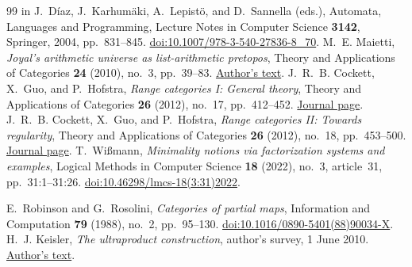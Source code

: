 \begin{thebibliography}{99}
in J.~D\'iaz, J.~Karhum\"aki, A.~Lepist\"o, and D.~Sannella (eds.),
Automata, Languages and Programming, Lecture Notes in Computer Science
\textbf{3142}, Springer, 2004, pp.~831--845.
\href{https://doi.org/10.1007/978-3-540-27836-8_70}{doi:10.1007/978-3-540-27836-8\_70}.
M.~E. Maietti, \emph{Joyal's arithmetic universe as list-arithmetic pretopos},
Theory and Applications of Categories \textbf{24} (2010),
no.~3, pp.~39--83.
\href{https://www.math.unipd.it/~maietti/papers/jartacrev.pdf}{Author's text}.
J.~R.~B. Cockett, X.~Guo, and P.~Hofstra,
\emph{Range categories I: General theory},
Theory and Applications of Categories \textbf{26} (2012),
no.~17, pp.~412--452.
\href{https://www.tac.mta.ca/tac/volumes/26/17/26-17abs.html}{Journal page}.
J.~R.~B. Cockett, X.~Guo, and P.~Hofstra,
\emph{Range categories II: Towards regularity},
Theory and Applications of Categories \textbf{26} (2012),
no.~18, pp.~453--500.
\href{https://www.tac.mta.ca/tac/volumes/26/18/26-18abs.html}{Journal page}.
T.~Wi\ss{}mann, \emph{Minimality notions via factorization systems and examples},
Logical Methods in Computer Science \textbf{18} (2022),
no.~3, article~31, pp.~31:1--31:26.
\href{https://doi.org/10.46298/lmcs-18(3:31)2022}{doi:10.46298/lmcs-18(3:31)2022}.

E.~Robinson and G.~Rosolini, \emph{Categories of partial maps},
Information and Computation \textbf{79} (1988), no.~2, pp.~95--130.
\href{https://doi.org/10.1016/0890-5401(88)90034-X}{doi:10.1016/0890-5401(88)90034-X}.
H.~J. Keisler, \emph{The ultraproduct construction},
author's survey, 1 June 2010.
\href{https://people.math.wisc.edu/~hkeisler/ultraproducts-web-final.pdf}{Author's text}.
\end{thebibliography}
